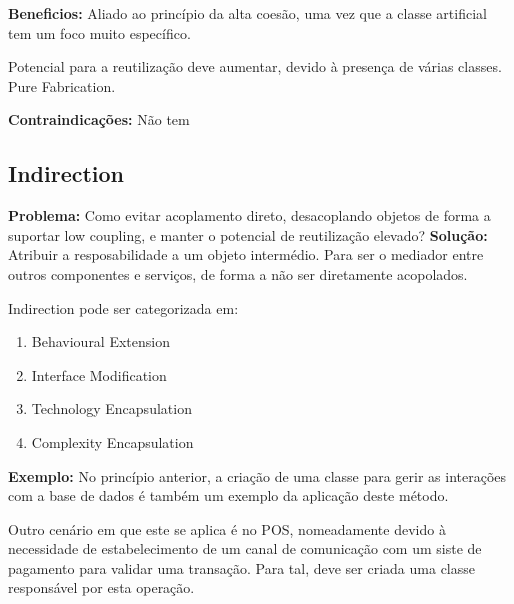 \documentclass{article}
\begin{document}
\begin{flushleft}
    \textbf{Beneficios:} 
    Aliado ao princípio da alta coesão, uma vez que a classe artificial tem um foco muito
    específico.

    Potencial para a reutilização deve aumentar, devido à presença de várias classes.
    Pure Fabrication.
\end{flushleft}

\begin{flushleft}
    \textbf{Contraindicações:} Não tem
\end{flushleft}

\pagebreak

\subsection{Indirection}

\begin{flushleft}
    \textbf{Problema:} Como evitar acoplamento direto, desacoplando objetos de forma a
    suportar low coupling, e manter o potencial de reutilização elevado?
    \vspace{3mm}
    \textbf{Solução:} Atribuir a resposabilidade a um objeto intermédio. Para ser o mediador
    entre outros componentes e serviços, de forma a não ser diretamente acopolados.
\end{flushleft}

Indirection pode ser categorizada em:

\begin{enumerate}
    \item Behavioural Extension
    \item Interface Modification
    \item Technology Encapsulation
    \item Complexity Encapsulation
\end{enumerate}

\begin{flushleft}
    \textbf{Exemplo:} No princípio anterior, a criação de uma classe para gerir as interações com a base de dados é também um
    exemplo da aplicação deste método.

    Outro cenário em que este se aplica é no POS, nomeadamente devido à necessidade de estabelecimento
    de um canal de comunicação com um siste de pagamento para validar uma transação. Para tal, deve ser
    criada uma classe responsável por esta operação.
\end{flushleft}
\end{document}
